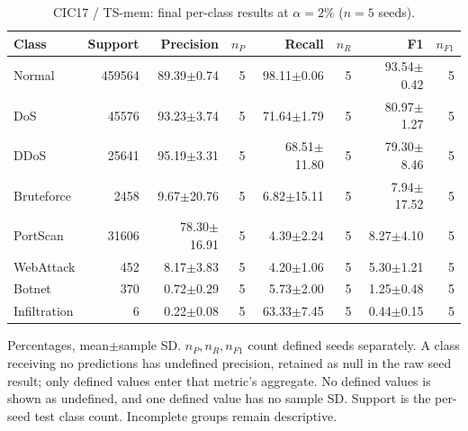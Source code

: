 \begin{table}[t]
\centering\scriptsize
\setlength{\tabcolsep}{3.3pt}
\caption{CIC17 / TS-mem: final per-class results at $\alpha=2\%$ ($n=5$ seeds).}\label{tab:forgetting-class-cic_ids_2017-ts-mem}
\begin{tabular}{lrrrrrrr}
\toprule
Class & Support & Precision & $n_P$ & Recall & $n_R$ & F1 & $n_{F1}$ \\
\midrule
Normal & 459564 & 89.39$\pm$0.74 & 5 & 98.11$\pm$0.06 & 5 & 93.54$\pm$0.42 & 5 \\
DoS & 45576 & 93.23$\pm$3.74 & 5 & 71.64$\pm$1.79 & 5 & 80.97$\pm$1.27 & 5 \\
DDoS & 25641 & 95.19$\pm$3.31 & 5 & 68.51$\pm$11.80 & 5 & 79.30$\pm$8.46 & 5 \\
Bruteforce & 2458 & 9.67$\pm$20.76 & 5 & 6.82$\pm$15.11 & 5 & 7.94$\pm$17.52 & 5 \\
PortScan & 31606 & 78.30$\pm$16.91 & 5 & 4.39$\pm$2.24 & 5 & 8.27$\pm$4.10 & 5 \\
WebAttack & 452 & 8.17$\pm$3.83 & 5 & 4.20$\pm$1.06 & 5 & 5.30$\pm$1.21 & 5 \\
Botnet & 370 & 0.72$\pm$0.29 & 5 & 5.73$\pm$2.00 & 5 & 1.25$\pm$0.48 & 5 \\
Infiltration & 6 & 0.22$\pm$0.08 & 5 & 63.33$\pm$7.45 & 5 & 0.44$\pm$0.15 & 5 \\
\bottomrule
\end{tabular}
\par\smallskip\begin{minipage}{0.98\textwidth}\scriptsize Percentages, mean$\pm$sample SD. $n_P,n_R,n_{F1}$ count defined seeds separately. A class receiving no predictions has undefined precision, retained as null in the raw seed result; only defined values enter that metric's aggregate. No defined values is shown as undefined, and one defined value has no sample SD. Support is the per-seed test class count. Incomplete groups remain descriptive.\end{minipage}
\end{table}

